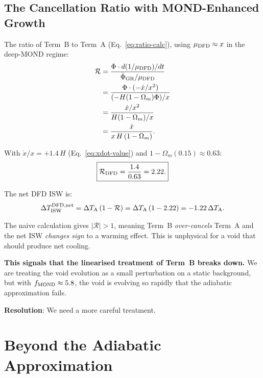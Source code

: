 \documentclass[11pt,a4paper]{article}
\newcommand{\mufd}{\mu_{\rm DFD}}
\newcommand{\Omm}{\Omega_m}
\begin{document}
\subsection{The Cancellation Ratio with MOND-Enhanced Growth}
\label{sec:cancel-ratio}

The ratio of Term~B to Term~A (Eq.~\ref{eq:ratio-calc}), using
$\mufd \approx x$ in the deep-MOND regime:
\begin{align}
\mathcal{R}
&= \frac{\Phi\cdot d(1/\mufd)/dt}{\dot{\Phi}_{\rm GR}/\mufd}
\nonumber\\
&= \frac{\Phi\cdot(-\dot{x}/x^2)}{(-H(1-\Omm)\Phi)/x}
\nonumber\\
&= \frac{\dot{x}/x^2}{H(1-\Omm)/x}
\nonumber\\
&= \frac{\dot{x}}{x\,H\,(1-\Omm)}.
\label{eq:R-exact}
\end{align}

With $\dot{x}/x = +1.4\,H$ (Eq.~\ref{eq:xdot-value}) and
$1 - \Omm(0.15) \approx 0.63$:
\begin{equation}
\boxed{\mathcal{R}_{\rm DFD}
= \frac{1.4}{0.63} = 2.22.}
\label{eq:R-DFD}
\end{equation}

The net DFD ISW is:
\begin{equation}
\Delta T_{\rm ISW}^{\rm DFD,net}
= \Delta T_{\rm A}\,(1 - \mathcal{R})
= \Delta T_{\rm A}\,(1 - 2.22)
= -1.22\,\Delta T_{\rm A}.
\label{eq:net-naive}
\end{equation}

\begin{tcolorbox}[colback=red!5!white, colframe=red!60!black,
  title=\textbf{Problem: Over-Cancellation}]
The naive calculation gives $|\mathcal{R}| > 1$, meaning Term~B
\emph{over-cancels} Term~A and the net ISW \emph{changes sign} to
a warming effect. This is unphysical for a void that should produce
net cooling.

\textbf{This signals that the linearised treatment of Term~B breaks
down.} We are treating the void evolution as a small perturbation on
a static background, but with $f_{\rm MOND} \approx 5.8$, the void
is evolving so rapidly that the adiabatic approximation fails.

\textbf{Resolution}: We need a more careful treatment.
\end{tcolorbox}


\section{Beyond the Adiabatic Approximation}
\label{sec:beyond-adiabatic}
\end{document}
